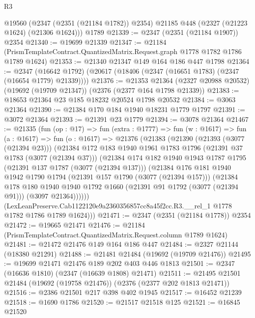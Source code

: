 \begin{lexlean}{R3}
\begin{coremodule}
    @19560 (@2347 (@2351 (@21184 @1782)) @2354) @21185 @448 (@2327 (@21223 @1624) (@21306 @1624)))
    @1789
@21339 := @2347 (@2351 (@21184 @1907)) @2354
@21340 := @19699 @21339
@21347 := @21184 (PrismTemplateContract.QuantizedMatrix.Request.graph @1778 @1782 @1786 @1789 @1624)
@21353 := @21340 @21347 @149 @164 @186 @447 @1798
@21364 := @2347
    (@16642 @1792)
    (@20617 (@18406 (@2347 (@16651 @1783) (@2347 (@16654 @1779) @21339))))
@21376 := @21353
    @21364
    (@2327 @20988 @20532)
    (@19692 (@19709 @21347))
    (@2376 (@2377 @164 @1798 @21339))
@21383 := @18653 @21364 @23 @185 @18232 @20524 @1798 @20532
@21384 := @3063 @21364
@21390 := @21384 @170 @184 @1940 @18231 @1779 @1797
@21391 := @3072 @21364
@21393 := @21391 @23 @1779
@21394 := @3078 @21364
@21467 := @21335
    (fun (op : @17) =>
    fun (extra : @1777) =>
    fun (w : @1617) =>
    fun (a : @1617) =>
    fun (o : @1617) =>
    @21376
      (@21383
        (@21390
          (@21393 (@3077 (@21394 @23)))
          (@21384
            @172
            @183
            @1940
            @1961
            @1783
            @1796
            (@21391 @37 @1783 (@3077 (@21394 @37)))
            (@21384
              @174
              @182
              @1940
              @1943
              @1787
              @1795
              (@21391 @137 @1787 (@3077 (@21394 @137)))
              (@21384
                @176
                @181
                @1940
                @1942
                @1790
                @1794
                (@21391 @157 @1790 (@3077 (@21394 @157)))
                (@21384
                  @178
                  @180
                  @1940
                  @1940
                  @1792
                  @1660
                  (@21391 @91 @1792 (@3077 (@21394 @91)))
                  (@3097 @21364))))))
        (LexLeanPreserve.Cab1122120e9a2360356857cc8a45f2cc.R3.__rel_1
          @1778
          @1782
          @1786
          @1789
          @1624)))
@21471 := @2347 (@2351 (@21184 @1778)) @2354
@21472 := @19665 @21471
@21476 := @21184 (PrismTemplateContract.QuantizedMatrix.Request.column @1789 @1624)
@21481 := @21472 @21476 @149 @164 @186 @447
@21484 := @2327 @21144 (@18380 @21291)
@21488 := @21481 @21484 (@19692 (@19709 @21476))
@21495 := @19699 @21471 @21476 @189 @202 @403 @446 @1813
@21501 := @2347 (@16636 @1810) (@2347 (@16639 @1808) @21471)
@21511 := @21495 @21501 @21484 (@19692 (@19758 @21476)) (@2376 (@2377 @202 @1813 @21471))
@21516 := @2386 @21501 @217 @398 @402 @1945
@21517 := @16452 @21239
@21518 := @1690 @1786
@21520 := @21517 @21518 @125
@21521 := @16845 @21520

\end{coremodule}
\end{lexlean}
